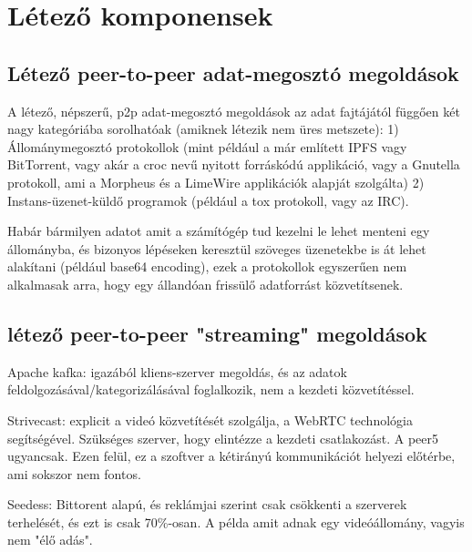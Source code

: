 \chapter{L\'{e}tez\H{o} komponensek}

\section{Létező peer-to-peer adat-megosztó megoldások}

A létező, népszerű, p2p adat-megosztó megoldások az adat fajtájától
függően két nagy kategóriába sorolhatóak (amiknek létezik nem üres metszete): 1) Állománymegosztó protokollok
(mint például a már említett IPFS vagy BitTorrent, vagy akár a croc nevű
nyitott forráskódú applikáció, vagy a Gnutella protokoll, ami a Morpheus
és a LimeWire applikációk alapját szolgálta) 2) Instans-üzenet-küldő
programok (például a tox protokoll, vagy az IRC).

Habár bármilyen adatot amit a számítógép tud kezelni le lehet menteni egy
állományba, és bizonyos lépéseken keresztül szöveges üzenetekbe is át
lehet alakítani (például base64 encoding), ezek a protokollok egyszerűen
nem alkalmasak arra, hogy egy állandóan frissülő adatforrást
közvetítsenek.

\section{létező peer-to-peer "streaming" megoldások}

Apache kafka: igazából kliens-szerver megoldás, és az adatok
feldolgozásával/kategorizálásával foglalkozik, nem a kezdeti
közvetítéssel.

Strivecast\citep{st}: explicit a videó közvetítését szolgálja, a
WebRTC technológia segítségével. Szükséges szerver, hogy elintézze a
kezdeti csatlakozást. A peer5 ugyancsak. Ezen felül, ez a szoftver a
kétirányú kommunikációt helyezi előtérbe, ami sokszor nem fontos.

Seedess: Bittorent alapú, és reklámjai szerint csak csökkenti a szerverek
terhelését, és ezt is csak 70\%-osan. A példa amit adnak egy
videóállomány, vagyis nem "élő adás".
